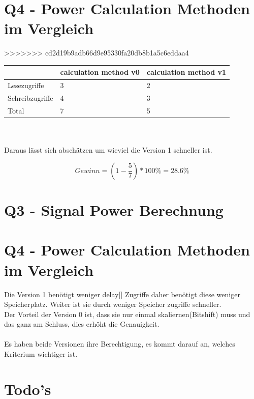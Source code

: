 \documentclass[a4paper,11pt]{article}
\begin{document}
\section{Q4 - Power Calculation Methoden im Vergleich}
>>>>>>> cd2d19b9adb66d9e95330fa20db8b1a5c6eddaa4
\begin{tabular}{lll}
\hline
   & calculation method v0 & calculation method v1 \\
\hline
Lesezugriffe    & 3 & 2 \\
Schreibzugriffe & 4 & 3 \\
Total			& 7	& 5	\\
\hline
\end{tabular}
\\\\
Daraus lässt sich abschätzen um wieviel die Version 1 schneller ist.

\begin{equation}\label{eq:v0 vs. v1}
	Gewinn = (1-\frac{5}{7})*100\% = 28.6\%
\end{equation}

\section{Q3 - Signal Power Berechnung}

\section{Q4 - Power Calculation Methoden im Vergleich}

Die Version 1 benötigt weniger delay[] Zugriffe daher benötigt diese weniger Speicherplatz. Weiter ist sie durch weniger Speicher zugriffe schneller. \\
Der Vorteil der Version 0 ist, dass sie nur einmal skaliernen(Bitshift) muss und das ganz am Schluss, dies erhöht die Genauigkeit.
\\\\
Es haben beide Versionen ihre Berechtigung, es kommt darauf an, welches Kriterium wichtiger ist.

\section{Todo's}
\end{document}

